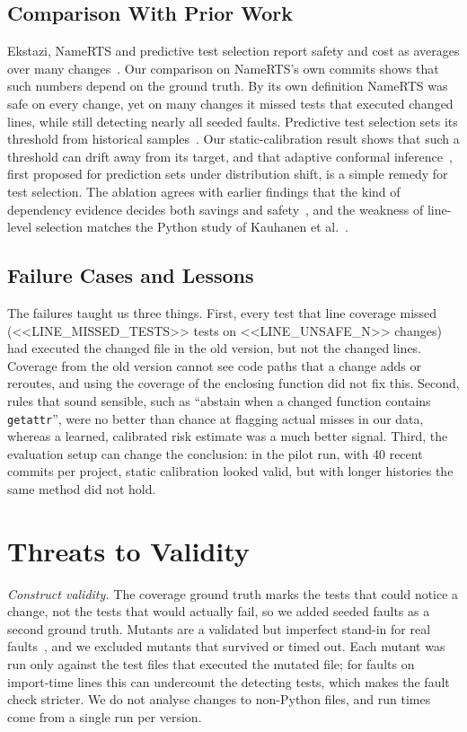 \documentclass[conference]{IEEEtran}
\begin{document}
\subsection{Comparison With Prior Work}
Ekstazi, NameRTS and predictive test selection report safety and cost as averages over many changes~\cite{gligoric2015ekstazi,wang2026namerts,machalica2019pts}. Our comparison on NameRTS's own commits shows that such numbers depend on the ground truth. By its own definition NameRTS was safe on every change, yet on many changes it missed tests that executed changed lines, while still detecting nearly all seeded faults. Predictive test selection sets its threshold from historical samples~\cite{machalica2019pts}. Our static-calibration result shows that such a threshold can drift away from its target, and that adaptive conformal inference~\cite{gibbs2021aci}, first proposed for prediction sets under distribution shift, is a simple remedy for test selection. The ablation agrees with earlier findings that the kind of dependency evidence decides both savings and safety~\cite{gligoric2015ekstazi,legunsen2016static}, and the weakness of line-level selection matches the Python study of Kauhanen et al.~\cite{kauhanen2021python}.

\subsection{Failure Cases and Lessons}
The failures taught us three things. First, every test that line coverage missed (<<LINE_MISSED_TESTS>> tests on <<LINE_UNSAFE_N>> changes) had executed the changed file in the old version, but not the changed lines. Coverage from the old version cannot see code paths that a change adds or reroutes, and using the coverage of the enclosing function did not fix this. Second, rules that sound sensible, such as ``abstain when a changed function contains \texttt{getattr}'', were no better than chance at flagging actual misses in our data, whereas a learned, calibrated risk estimate was a much better signal. Third, the evaluation setup can change the conclusion: in the pilot run, with 40 recent commits per project, static calibration looked valid, but with longer histories the same method did not hold.

\section{Threats to Validity}\label{sec:threats}
\textit{Construct validity.} The coverage ground truth marks the tests that could notice a change, not the tests that would actually fail, so we added seeded faults as a second ground truth. Mutants are a validated but imperfect stand-in for real faults~\cite{just2014mutants}, and we excluded mutants that survived or timed out. Each mutant was run only against the test files that executed the mutated file; for faults on import-time lines this can undercount the detecting tests, which makes the fault check stricter. We do not analyse changes to non-Python files, and run times come from a single run per version.
\end{document}
